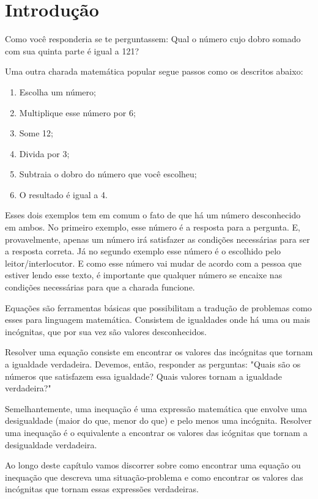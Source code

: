 \section{Introdução}
\label{eq:intro}
Como você responderia se te perguntassem: Qual o número cujo dobro somado com sua quinta parte é igual a 121? 

Uma outra charada matemática popular segue passos como os descritos abaixo:

\begin{enumerate}[label=\textbf{\arabic*}.]
  \item Escolha um número;
  \item Multiplique esse número por 6;
  \item Some 12;
  \item Divida por 3;
  \item Subtraia o dobro do número que você escolheu; 
  \item O resultado é igual a 4.
\end{enumerate}

Esses dois exemplos tem em comum o fato de que há um número desconhecido em ambos. No primeiro exemplo, esse número é a resposta para a pergunta. E, provavelmente, apenas um número irá satisfazer as condições necessárias para ser a resposta correta. Já no segundo exemplo esse número é o escolhido pelo leitor/interlocutor. E como esse número vai mudar de acordo com a pessoa que estiver lendo esse texto, é importante que qualquer número se encaixe nas condições necessárias para que a charada funcione. 

Equações são ferramentas básicas que possibilitam a tradução de problemas como esses para linguagem matemática. Consistem de igualdades onde há uma ou mais incógnitas, que por sua vez são valores desconhecidos. 

Resolver uma equação consiste em encontrar os valores das incógnitas que tornam a igualdade verdadeira. Devemos, então, responder as perguntas: "Quais são os números que satisfazem essa igualdade? Quais valores tornam a igualdade verdadeira?"

Semelhantemente, uma inequação é uma expressão matemática que envolve uma desigualdade (maior do que, menor do que) e pelo menos uma incógnita. Resolver uma inequação é o equivalente a encontrar os valores das icógnitas que tornam a desigualdade verdadeira. 

Ao longo deste capítulo vamos discorrer sobre como encontrar uma equação ou inequação que descreva uma situação-problema e como encontrar os valores das incógnitas que tornam essas expressões verdadeiras. 

